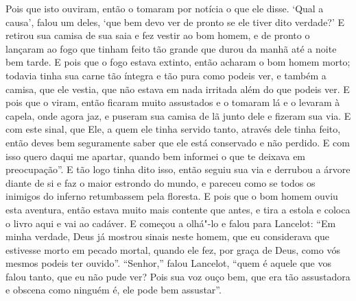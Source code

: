 Pois que isto ouviram, então o tomaram por notícia o que ele disse. ‘Qual a
causa’, falou um deles, ‘que bem devo ver de pronto se ele tiver dito verdade?’
E retirou sua camisa de sua saia e fez vestir ao bom homem, e de pronto o
lançaram ao fogo que tinham feito tão grande que durou da manhã até a noite bem
tarde. E pois que o fogo estava extinto, então acharam o bom homem morto;
todavia tinha sua carne tão íntegra e tão pura como podeis ver, e também a
camisa, que ele vestia, que não estava em nada irritada além do que podeis ver.
E pois que o viram, então ficaram muito assustados e o tomaram lá e o levaram à
capela, onde agora jaz, e puseram sua camisa de lã junto dele e fizeram sua
via. E com este sinal, que Ele, a quem ele tinha servido tanto, através dele
tinha feito, então deves bem seguramente saber que ele está conservado e não
perdido. E com isso quero daqui me apartar, quando bem informei o que te
deixava em preocupação”.  E tão logo tinha dito isso, então
seguiu sua via e derrubou a árvore diante de si e faz o maior estrondo do
mundo, e pareceu como se todos os inimigos do inferno retumbassem pela
floresta. E pois que o bom homem ouviu esta aventura, então estava muito mais
contente que antes, e tira a estola e coloca o livro aqui e vai ao cadáver. E
começou a olhá"-lo e falou para Lancelot: “Em minha verdade, Deus já mostrou
sinais neste homem, que eu considerava que estivesse morto em pecado mortal,
quando ele fez, por graça de Deus, como vós mesmos podeis ter ouvido”.
“Senhor,” falou Lancelot, “quem é aquele que vos falou tanto, que eu não pude
ver? Pois sua voz ouço bem, que era tão assustadora e obscena  como ninguém é,
ele pode bem assustar”.

